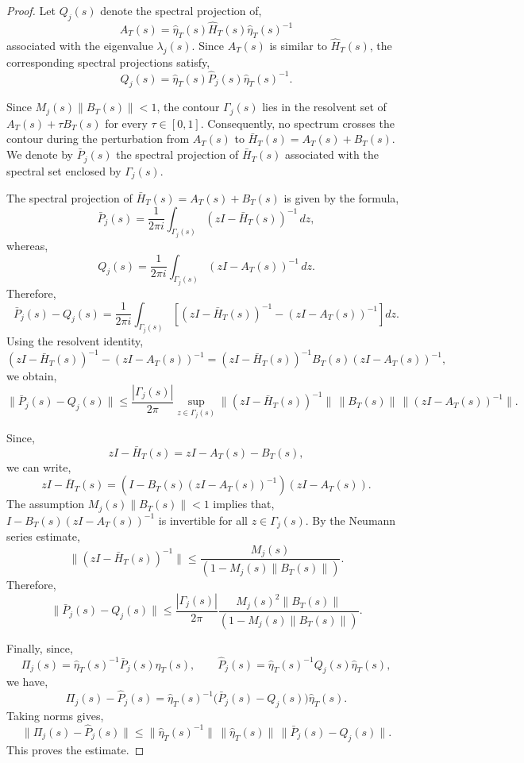 \documentclass[pdflatex,sn-mathphys-num]{sn-jnl}
\theoremstyle{thmstyleone}
\theoremstyle{thmstyletwo}
\theoremstyle{thmstylethree}
\begin{document}
\begin{proof}
Let \(Q_j(s)\) denote the spectral projection of,
\[
A_T(s)=\hat\eta_T(s)\hat H_T(s)\hat\eta_T(s)^{-1}
\]
associated with the eigenvalue \(\lambda_j(s)\). Since \(A_T(s)\) is similar to
\(\hat H_T(s)\), the corresponding spectral projections satisfy,
\[
Q_j(s)=\hat\eta_T(s)\hat P_j(s)\hat\eta_T(s)^{-1}.
\]

Since \(M_j(s)\|B_T(s)\|<1\), the contour \(\Gamma_j(s)\) lies in the
resolvent set of \(A_T(s)+\tau B_T(s)\) for every \(\tau\in[0,1]\).
Consequently, no spectrum crosses the contour during the perturbation from
\(A_T(s)\) to \(\bar H_T(s)=A_T(s)+B_T(s)\). We denote by \(\bar P_j(s)\) the
spectral projection of \(\bar H_T(s)\) associated with the spectral set enclosed by
\(\Gamma_j(s)\).

The spectral projection of \(\bar H_T(s)=A_T(s)+B_T(s)\) is given by the formula,
\[
\bar P_j(s)=\frac{1}{2\pi i}\int_{\Gamma_j(s)}
(zI-\bar H_T(s))^{-1}\,dz,
\]
whereas,
\[
Q_j(s)=\frac{1}{2\pi i}\int_{\Gamma_j(s)}
(zI-A_T(s))^{-1}\,dz.
\]
Therefore,
\[
\bar P_j(s)-Q_j(s)
=
\frac{1}{2\pi i}\int_{\Gamma_j(s)}
\left[(zI-\bar H_T(s))^{-1}-(zI-A_T(s))^{-1}\right]dz.
\]
Using the resolvent identity,
\[
(zI-\bar H_T(s))^{-1}-(zI-A_T(s))^{-1}
=
(zI-\bar H_T(s))^{-1}B_T(s)(zI-A_T(s))^{-1},
\]
we obtain,
\[
\|\bar P_j(s)-Q_j(s)\|
\le
\frac{|\Gamma_j(s)|}{2\pi}
\sup_{z\in\Gamma_j(s)}
\|(zI-\bar H_T(s))^{-1}\|\,\|B_T(s)\|\,
\|(zI-A_T(s))^{-1}\|.
\]

Since,
\[
zI-\bar H_T(s)
=
zI-A_T(s)-B_T(s),
\]
we can write,
\[
zI-\bar H_T(s)
=
\left(I-B_T(s)(zI-A_T(s))^{-1}\right)(zI-A_T(s)).
\]
The assumption \(M_j(s)\|B_T(s)\|<1\) implies that,
\(
I-B_T(s)(zI-A_T(s))^{-1}
\)
is invertible for all \(z\in\Gamma_j(s)\). By the Neumann series estimate,
\[
\|(zI-\bar H_T(s))^{-1}\|
\le
\frac{M_j(s)}{(1-M_j(s)\|B_T(s)\|)}.
\]
Therefore,
\[
\|\bar P_j(s)-Q_j(s)\|
\le
\frac{|\Gamma_j(s)|}{2\pi}
\frac{M_j(s)^2\|B_T(s)\|}{(1-M_j(s)\|B_T(s)\|)}.
\]

Finally, since,
\[
\Pi_j(s)=\hat\eta_T(s)^{-1}\bar P_j(s)\hat\eta_T(s),
\qquad
\hat P_j(s)=\hat\eta_T(s)^{-1}Q_j(s)\hat\eta_T(s),
\]
we have,
\[
\Pi_j(s)-\hat P_j(s)
=
\hat\eta_T(s)^{-1}\big(\bar P_j(s)-Q_j(s)\big)\hat\eta_T(s).
\]
Taking norms gives,
\[
\|\Pi_j(s)-\hat P_j(s)\|
\le
\|\hat\eta_T(s)^{-1}\|\,\|\hat\eta_T(s)\|\,
\|\bar P_j(s)-Q_j(s)\|.
\]
This proves the estimate.
\end{proof}
\end{document}
